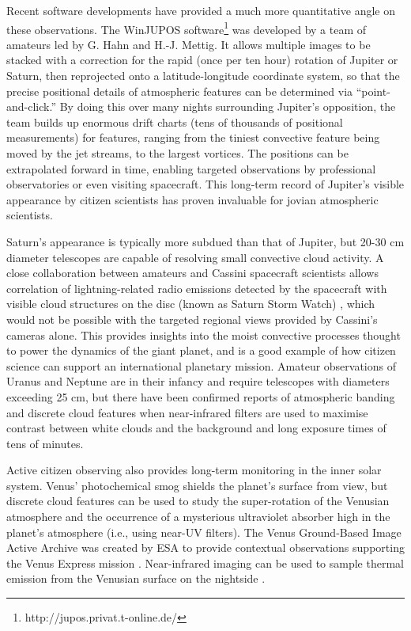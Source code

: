 \documentclass{ar2e}
\begin{document}
Recent software developments have provided a much more quantitative angle on
these observations. The WinJUPOS
software\footnote{http://jupos.privat.t-online.de/} was developed by a team of
amateurs led by G. Hahn and H.-J. Mettig. It allows multiple images to be
stacked with a correction for the rapid (once per ten hour) rotation of Jupiter
or Saturn, then reprojected onto a latitude-longitude coordinate system, so that
the precise positional details of atmospheric features can be determined via
``point-and-click.''  By doing this over many nights surrounding Jupiter's
opposition, the team builds up enormous drift charts (tens of thousands of
positional measurements) for features, ranging from the tiniest convective
feature being moved by the jet streams, to the largest vortices.  The positions
can be extrapolated forward in time, enabling targeted observations by
professional observatories or even visiting spacecraft.  This long-term record
of Jupiter's visible appearance by citizen scientists has proven invaluable for
jovian atmospheric scientists.

Saturn's appearance is typically more subdued than that of Jupiter, but 20-30 cm
diameter telescopes are capable of resolving small convective cloud activity.  A
close collaboration between amateurs and Cassini spacecraft scientists allows
correlation of lightning-related radio emissions detected by the spacecraft with
visible cloud structures on the disc (known as Saturn Storm Watch)
\citep[e.g.,][]{11fischer}, which would not be possible with the targeted
regional views provided by Cassini's cameras alone.  This provides insights into
the moist convective processes thought to power the dynamics of the giant
planet, and is a good example of how citizen science can support an
international planetary mission. Amateur observations of Uranus and Neptune are
in their infancy and require telescopes with diameters exceeding 25 cm, but
there have been confirmed reports of atmospheric banding and discrete cloud
features when near-infrared filters are used to maximise contrast between white
clouds and the background and long exposure times of tens of minutes.

Active citizen observing also provides long-term monitoring in the inner solar
system.  Venus' photochemical smog shields the planet's surface from view, but
discrete cloud features can be used to study the super-rotation of the Venusian
atmosphere and the occurrence of a mysterious ultraviolet absorber high in the
planet's atmosphere (i.e., using near-UV filters).  The Venus Ground-Based Image
Active Archive was created by ESA to provide contextual observations supporting
the Venus Express mission \citep{08barentsen}.  Near-infrared imaging can be
used to sample thermal emission from the Venusian surface on the nightside
\citep{93lecacheax}. 
\end{document}
